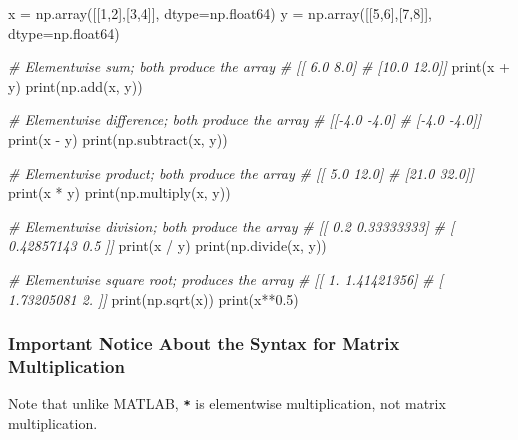 \documentclass[
]{article}
\newenvironment{Shaded}{}{}
\newcommand{\BuiltInTok}[1]{#1}
\newcommand{\CommentTok}[1]{\textcolor[rgb]{0.38,0.63,0.69}{\textit{#1}}}
\newcommand{\DecValTok}[1]{\textcolor[rgb]{0.25,0.63,0.44}{#1}}
\newcommand{\FloatTok}[1]{\textcolor[rgb]{0.25,0.63,0.44}{#1}}
\newcommand{\NormalTok}[1]{#1}
\newcommand{\OperatorTok}[1]{\textcolor[rgb]{0.40,0.40,0.40}{#1}}
\begin{document}
\begin{Shaded}
\begin{Highlighting}[]
\NormalTok{x }\OperatorTok{=}\NormalTok{ np.array([[}\DecValTok{1}\NormalTok{,}\DecValTok{2}\NormalTok{],[}\DecValTok{3}\NormalTok{,}\DecValTok{4}\NormalTok{]], dtype}\OperatorTok{=}\NormalTok{np.float64)}
\NormalTok{y }\OperatorTok{=}\NormalTok{ np.array([[}\DecValTok{5}\NormalTok{,}\DecValTok{6}\NormalTok{],[}\DecValTok{7}\NormalTok{,}\DecValTok{8}\NormalTok{]], dtype}\OperatorTok{=}\NormalTok{np.float64)}

\CommentTok{\# Elementwise sum; both produce the array}
\CommentTok{\# [[ 6.0  8.0]}
\CommentTok{\#  [10.0 12.0]]}
\BuiltInTok{print}\NormalTok{(x }\OperatorTok{+}\NormalTok{ y)}
\BuiltInTok{print}\NormalTok{(np.add(x, y))}

\CommentTok{\# Elementwise difference; both produce the array}
\CommentTok{\# [[{-}4.0 {-}4.0]}
\CommentTok{\#  [{-}4.0 {-}4.0]]}
\BuiltInTok{print}\NormalTok{(x }\OperatorTok{{-}}\NormalTok{ y)}
\BuiltInTok{print}\NormalTok{(np.subtract(x, y))}

\CommentTok{\# Elementwise product; both produce the array}
\CommentTok{\# [[ 5.0 12.0]}
\CommentTok{\#  [21.0 32.0]]}
\BuiltInTok{print}\NormalTok{(x }\OperatorTok{*}\NormalTok{ y)}
\BuiltInTok{print}\NormalTok{(np.multiply(x, y))}

\CommentTok{\# Elementwise division; both produce the array}
\CommentTok{\# [[ 0.2         0.33333333]}
\CommentTok{\#  [ 0.42857143  0.5       ]]}
\BuiltInTok{print}\NormalTok{(x }\OperatorTok{/}\NormalTok{ y)}
\BuiltInTok{print}\NormalTok{(np.divide(x, y))}

\CommentTok{\# Elementwise square root; produces the array}
\CommentTok{\# [[ 1.          1.41421356]}
\CommentTok{\#  [ 1.73205081  2.        ]]}
\BuiltInTok{print}\NormalTok{(np.sqrt(x))}
\BuiltInTok{print}\NormalTok{(x}\OperatorTok{**}\FloatTok{0.5}\NormalTok{)}
\end{Highlighting}
\end{Shaded}

\hypertarget{important-notice-about-the-syntax-for-matrix-multiplication}{%
\subsubsection{Important Notice About the Syntax for Matrix
Multiplication}\label{important-notice-about-the-syntax-for-matrix-multiplication}}

Note that unlike MATLAB, \textbf{\texttt{*}} is elementwise
multiplication, not matrix multiplication.
\end{document}
